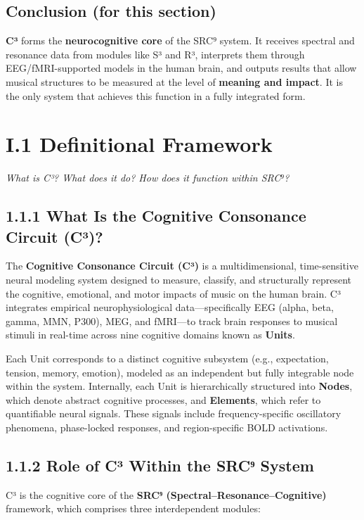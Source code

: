 \subsection*{Conclusion (for this section)}

\textbf{C³} forms the \textbf{neurocognitive core} of the SRC⁹ system. It receives spectral and resonance data from modules like S³ and R³, interprets them through EEG/fMRI-supported models in the human brain, and outputs results that allow musical structures to be measured at the level of \textbf{meaning and impact}. It is the only system that achieves this function in a fully integrated form.


\section*{I.1 Definitional Framework}

\textit{What is C³? What does it do? How does it function within SRC⁹?}

\subsection*{1.1.1 What Is the Cognitive Consonance Circuit (C³)?}

The \textbf{Cognitive Consonance Circuit (C³)} is a multidimensional, time-sensitive neural modeling system designed to measure, classify, and structurally represent the cognitive, emotional, and motor impacts of music on the human brain. C³ integrates empirical neurophysiological data—specifically EEG (alpha, beta, gamma, MMN, P300), MEG, and fMRI—to track brain responses to musical stimuli in real-time across nine cognitive domains known as \textbf{Units}.

Each Unit corresponds to a distinct cognitive subsystem (e.g., expectation, tension, memory, emotion), modeled as an independent but fully integrable node within the system. Internally, each Unit is hierarchically structured into \textbf{Nodes}, which denote abstract cognitive processes, and \textbf{Elements}, which refer to quantifiable neural signals. These signals include frequency-specific oscillatory phenomena, phase-locked responses, and region-specific BOLD activations.

\subsection*{1.1.2 Role of C³ Within the SRC⁹ System}

C³ is the cognitive core of the \textbf{SRC⁹ (Spectral–Resonance–Cognitive)} framework, which comprises three interdependent modules:

